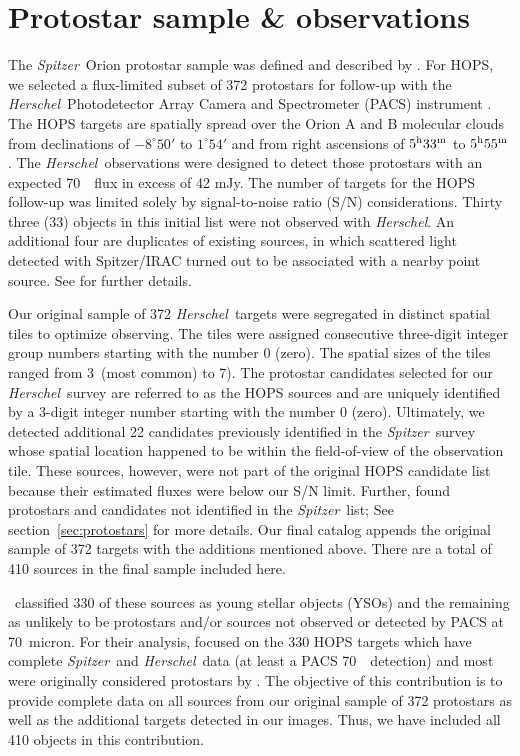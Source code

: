 \documentclass[manuscript]{aastex61}
\newcommand{\herschel}{{\em Herschel}}
\newcommand{\spitzer}{{\em Spitzer}}
\begin{document}
\section{Protostar sample \& observations}
\label{sec:sample}
\par
The \spitzer\ Orion protostar sample was defined and described by \cite{orion}.  For HOPS, we selected a flux-limited subset of 372 protostars for follow-up with the \herschel\ Photodetector Array Camera and Spectrometer (PACS) instrument \cite{pacs}.  The  HOPS targets are spatially spread over the Orion A and B molecular clouds from declinations of $-8^\circ50'$ to $1^\circ54'$ and from right ascensions of $5^{\rm h}33^{\rm m}$ to $5^{\rm h}55^{\rm m}$.  The \herschel\ observations were designed to detect those protostars with an expected 70~\micron\ flux in excess of 42 mJy.  The number of targets for the HOPS follow-up was limited solely by signal-to-noise ratio (S/N) considerations.   Thirty three (33) objects in this initial list were not observed with \herschel. An additional four are duplicates of existing sources, in which scattered light detected with Spitzer/IRAC turned out to be associated with a nearby point source.  See \citet{furlan} for further details.
\par
Our original sample of 372 \herschel\ targets were segregated in distinct spatial tiles to optimize observing.  The tiles were assigned consecutive three-digit integer group numbers starting with the number 0 (zero).  The spatial sizes of the tiles ranged from 3\arcmin\ (most common) to 7\arcmin).  The protostar candidates selected for our \herschel\ survey are referred to as the HOPS sources and are uniquely identified by a 3-digit integer number starting with the number 0 (zero).   Ultimately, we detected additional 22 candidates previously identified in the \spitzer\ survey whose spatial location happened to be within the field-of-view of the observation tile.  These sources, however, were not part of the original HOPS candidate list because their estimated fluxes were below our S/N limit.  Further, \cite{pbrpaper} found protostars and candidates not identified in the \spitzer\ list; See section~\ref{sec:protostars} for more details.  Our final catalog appends the original sample of 372 targets with the additions mentioned above.  There are a total of 410 sources in the final sample included here.
\par
\cite{furlan}\ classified 330 of these sources as young stellar objects (YSOs) and the remaining as unlikely to be protostars and/or sources not observed or detected by PACS at 70~micron.  For their analysis, \cite{furlan} focused on the 330 HOPS targets which have complete \spitzer\ and \herschel\ data (at least a PACS 70~\micron\ detection) and most were originally considered protostars by \cite{orion}.  The objective of this contribution is to provide complete data on all sources from our original sample of 372 protostars as well as the additional targets detected in our images.  Thus, we have included all 410 objects in this contribution.
\end{document}
